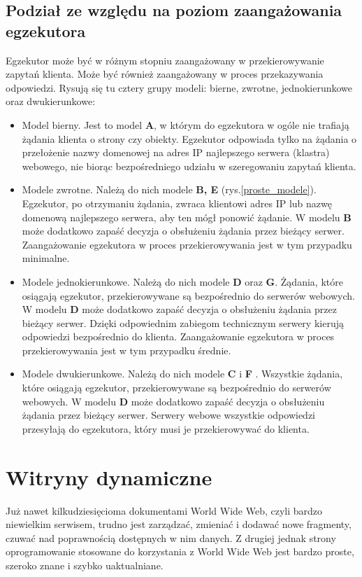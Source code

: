 \subsection{Podział ze względu na poziom zaangażowania egzekutora} 
Egzekutor może być w różnym stopniu zaangażowany w przekierowywanie zapytań klienta. Może być również zaangażowany w proces 
przekazywania odpowiedzi. Rysują się tu cztery grupy modeli: bierne, zwrotne, jednokierunkowe oraz dwukierunkowe:
\begin{itemize}
\item Model bierny. Jest to model {\bf A}, w którym do egzekutora w ogóle nie trafiają żądania klienta o strony czy obiekty. 
Egzekutor odpowiada tylko na żądania o przełożenie nazwy domenowej na adres IP najlepszego serwera (klastra) webowego, nie 
biorąc bezpośredniego udziału w szeregowaniu zapytań klienta.
\item Modele zwrotne. Należą do nich modele {\bf B, E} (rys.\ref{proste_modele}). Egzekutor, po otrzymaniu żądania, zwraca klientowi adres IP lub nazwę 
domenową najlepszego serwera, aby ten mógł ponowić żądanie. W modelu {\bf B} może dodatkowo zapaść decyzja o obsłużeniu żądania 
przez bieżący serwer. Zaangażowanie egzekutora w proces przekierowywania jest w tym przypadku minimalne.
\item Modele jednokierunkowe. Należą do nich modele {\bf D} oraz {\bf G}\cite{modele15,modele20,NDUsersGuide}. Żądania, które osiągają egzekutor, przekierowywane 
są bezpośrednio do serwerów webowych. W modelu {\bf D} może dodatkowo zapaść decyzja o obsłużeniu żądania przez bieżący serwer. 
Dzięki odpowiednim zabiegom technicznym serwery kierują odpowiedzi bezpośrednio do klienta. Zaangażowanie egzekutora w proces 
przekierowywania jest w tym przypadku średnie.
\item Modele dwukierunkowe. Należą do nich modele {\bf C} i {\bf F} \cite{modele1,modele11,modele17} . Wszystkie żądania, które osiągają egzekutor, 
przekierowywane są bezpośrednio do serwerów webowych. W modelu {\bf D} może dodatkowo zapaść decyzja o obsłużeniu żądania przez 
bieżący serwer. Serwery webowe wszystkie odpowiedzi przesyłają do egzekutora, który musi je przekierowywać do klienta. 
\end{itemize}

\section{Witryny dynamiczne}

\hspace{0.63cm}Już nawet kilkudziesięcioma dokumentami World Wide Web, czyli bardzo niewielkim serwisem, trudno jest zarządzać, 
zmieniać i dodawać nowe fragmenty, czuwać nad poprawnością dostępnych w nim danych. Z drugiej jednak strony oprogramowanie 
stosowane do korzystania z World Wide Web jest bardzo proste, szeroko znane i szybko uaktualniane.

